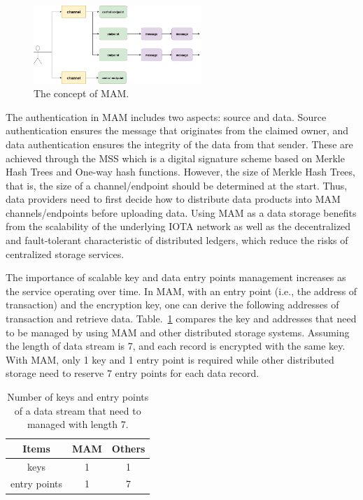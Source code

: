 \documentclass[conference]{IEEEtran}
\begin{document}
\begin{figure}[!t]
    \centering
    \includegraphics[width=2.5in]{mam_struct}
    \caption{The concept of MAM.}
    \label{fig:mam_struct}
\end{figure}

The authentication in MAM includes two aspects: source and data. Source authentication ensures the message that originates from the claimed owner, and data authentication ensures the integrity of the data from that sender. These are achieved through the MSS which is a digital signature scheme based on Merkle Hash Trees and One-way hash functions. However, the size of Merkle Hash Trees, that is, the size of a channel/endpoint should be determined at the start. Thus, data providers need to first decide how to distribute data products into MAM channels/endpoints before uploading data. Using MAM as a data storage benefits from the scalability of the underlying IOTA network as well as the decentralized and fault-tolerant characteristic of distributed ledgers, which reduce the risks of centralized storage services. 

The importance of scalable key and data entry points management increases as the service operating over time. In MAM, with an entry point (i.e., the address of transaction) and the encryption key, one can derive the following addresses of transaction and retrieve data. Table.~\ref{tab:mam_scalability} compares the key and addresses that need to be managed by using MAM and other distributed storage systems. Assuming the length of data stream is 7, and each record is encrypted with the same key. With MAM, only 1 key and 1 entry point is required while other distributed storage need to reserve 7 entry points for each data record.

\begin{table}[htbp]
	\caption{Number of keys and entry points of a data stream that need to managed with length 7.}
	\label{tab:mam_scalability}
	\begin{center}
	\begin{tabular}{|c|c|c|}
	\hline
		\textbf{Items} & \textbf{MAM} & \textbf{Others} \\ 
		\hline
		keys & 1 & 1 \\ 
		\hline
		entry points & 1 & 7 \\ 
		\hline
	\end{tabular}
	\end{center}
\end{table}
\end{document}
